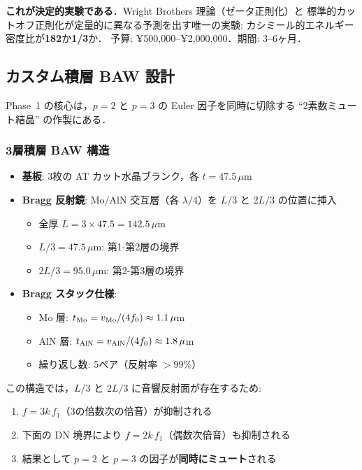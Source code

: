 \begin{experimentbox}
\textbf{これが決定的実験である}．Wright Brothers 理論（ゼータ正則化）と
標準的カットオフ正則化が定量的に異なる予測を出す唯一の実験:
カシミール的エネルギー密度比が\textbf{182}か\textbf{1/3}か．
予算: ¥500,000--¥2,000,000．期間: 3--6ヶ月．
\end{experimentbox}

\subsection{カスタム積層 BAW 設計}

Phase~1 の核心は，$p=2$ と $p=3$ の Euler 因子を同時に切除する
``2素数ミュート結晶'' の作製にある．

\subsubsection{3層積層 BAW 構造}

\begin{itemize}
\item \textbf{基板}: 3枚の AT カット水晶ブランク，各 $t = 47.5\,\mu$m
\item \textbf{Bragg 反射鏡}: Mo/AlN 交互層（各 $\lambda/4$）を
  $L/3$ と $2L/3$ の位置に挿入
  \begin{itemize}
  \item 全厚 $L = 3 \times 47.5 = 142.5\,\mu$m
  \item $L/3 = 47.5\,\mu$m: 第1-第2層の境界
  \item $2L/3 = 95.0\,\mu$m: 第2-第3層の境界
  \end{itemize}
\item \textbf{Bragg スタック仕様}:
  \begin{itemize}
  \item Mo 層: $t_{\rm Mo} = v_{\rm Mo}/(4f_0) \approx 1.1\,\mu$m
  \item AlN 層: $t_{\rm AlN} = v_{\rm AlN}/(4f_0) \approx 1.8\,\mu$m
  \item 繰り返し数: 5ペア（反射率 $> 99\%$）
  \end{itemize}
\end{itemize}

この構造では，$L/3$ と $2L/3$ に音響反射面が存在するため:
\begin{enumerate}
\item $f = 3k\,f_1$（3の倍数次の倍音）が抑制される
\item 下面の DN 境界により $f = 2k\,f_1$（偶数次倍音）も抑制される
\item 結果として $p = 2$ と $p = 3$ の因子が\textbf{同時にミュート}される
\end{enumerate}

